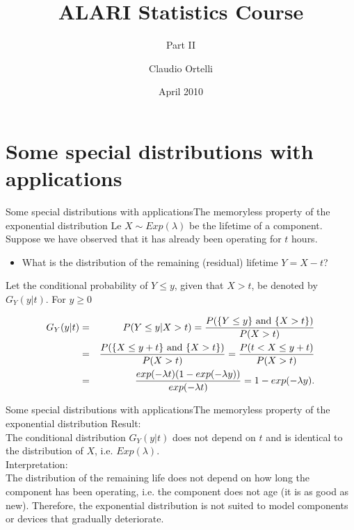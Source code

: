 \documentclass[handout]{beamer}
\title[ALARI Statistics Course]{ALARI Statistics Course}
\subtitle{Part II}
\author[Claudio Ortelli]{Claudio Ortelli}
\institute[USI]{Universit\`{a} della Svizzera italiana}
\date[29/2010]{April 2010}
\begin{document}
\maketitle


\section{Some special distributions with applications}


\begin{frame}{Some special distributions with applications}{The memoryless property of the exponential distribution}
Le $X\sim Exp(\lambda)$ be the lifetime of a component. Suppose we have observed that it has already been operating 
for $t$ hours.
\begin{itemize}
 \item What is the distribution of the remaining (residual) lifetime $Y=X-t$?
\end{itemize}
Let the conditional probability of $Y \leq y$, given that $X>t$, be denoted by $G_Y(y\rvert t)$. For $y\geq 0$

\begin{eqnarray*}
G_Y(y\rvert t) &=& P(Y \leq y \rvert X>t) = \frac{P(\{Y \leq y \} \textnormal{ and } \{X>t\})}{P(X>t)} \\
&=& \frac{P(\{X \leq y+t \} \textnormal{ and } \{X>t\})}{P(X>t)} = \frac{P(t < X \leq y+t)}{P(X>t)} \\
&=& \frac{exp(-\lambda t)(1-exp(-\lambda y))}{exp(-\lambda t)} = 1-exp(-\lambda y).
\end{eqnarray*}
\end{frame}
 

\begin{frame}{Some special distributions with applications}{The memoryless property of the exponential distribution}
Result:\\
The conditional distribution $G_Y(y\rvert t)$ does not depend on $t$ and is identical to the distribution of $X$, i.e. 
$Exp(\lambda)$.\\
\vspace{1cm}
Interpretation:\\
The distribution of the remaining life does not depend on how long the component has been operating, i.e. the component 
does not age (it is as good as new). Therefore, the exponential distribution is not suited to model components or devices
that gradually deteriorate.  

\end{frame}
\end{document}
